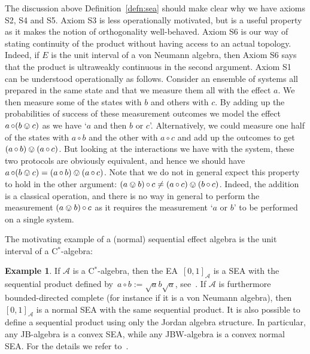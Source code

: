 \documentclass[a4paper, onecolumn, accepted=2020-12-22]{quantumarticle}
\newcommand{\mult}{\mathop{\circ}}
\newcommand{\TODO}[1]{\textcolor{blue}{\emph{[ #1 ]}}}
\newcommand{\aw}[1]{\TODO{\textbf{aw:} #1}}
\newcounter{counter}
\theoremstyle{definition}
\newtheorem{example}[counter]{Example}
\begin{document}
  The discussion above Definition~\ref{defn:sea}
  should make clear why we have axioms S2, S4 and S5. 
Axiom S3 is less operationally motivated, but is a useful property as it makes the notion of orthogonality well-behaved. 
Axiom S6 is our way of stating continuity of the product without having access to an actual topology. 
Indeed, if $E$ is the unit interval of a von Neumann algebra, then Axiom S6 says  that the product is ultraweakly continuous in the second argument.
Axiom S1 can be understood operationally as follows.
Consider an ensemble of systems all prepared in the same state and that we measure them all with the effect $a$. We then measure some of the states with $b$ and others with $c$. By adding up the probabilities of success of these measurement outcomes we model the effect $a\mult (b\ovee c)$ as we have `$a$ and then $b$ or $c$'. Alternatively, we could measure one half of the states with $a\mult b$ and the other with $a\mult c$ and add up the outcomes to get $(a\mult b) \ovee (a\mult c)$. But looking at the interactions we have with the system, these two protocols are obviously equivalent, and hence we should have $a\mult (b\ovee c) = (a\mult b) \ovee (a\mult c)$.
Note that we do not in general expect this property to hold in the other argument: $(a\ovee b)\mult c \neq (a\mult c) \ovee (b\mult c)$. Indeed, the addition is a classical operation, and there is no way in general to perform the measurement $(a\ovee b)\mult c$ as it requires the measurement `$a$ or $b$' to be performed on a single system.

\noindent The motivating example of a (normal) sequential effect algebra is the unit interval of a C$^*$-algebra:

\begin{example}
    \label{ex:canonical-sea}
If $\mathscr{A}$ is a C$^*$-algebra, then the EA~$[0,1]_{\mathscr{A}}$ is a SEA with
    the sequential product defined by~$a \mult b := \sqrt{a} b \sqrt{a}$,
    see~\cite{gudder2002sequential}.
    If $\mathscr{A}$ is furthermore bounded-directed complete
        (for instance if it is a von Neumann algebra),
    then $[0,1]_\mathscr{A}$ is a normal SEA
    with the same sequential product.
    It is also possible to define a sequential product using only the Jordan algebra structure. In particular, any JB-algebra is a convex SEA, while any JBW-algebra is a convex normal SEA. For the details we refer to~\cite{wetering2019commutativity}.
\end{example}
\end{document}
